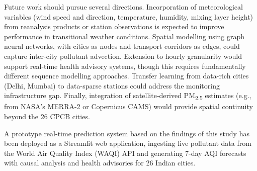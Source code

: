 \documentclass[conference]{IEEEtran}
\begin{document}
Future work should pursue several directions. Incorporation of meteorological variables (wind speed and direction, temperature, humidity, mixing layer height) from reanalysis products or station observations is expected to improve performance in transitional weather conditions. Spatial modelling using graph neural networks, with cities as nodes and transport corridors as edges, could capture inter-city pollutant advection. Extension to hourly granularity would support real-time health advisory systems, though this requires fundamentally different sequence modelling approaches. Transfer learning from data-rich cities (Delhi, Mumbai) to data-sparse stations could address the monitoring infrastructure gap. Finally, integration of satellite-derived PM\textsubscript{2.5} estimates (e.g., from NASA's MERRA-2 or Copernicus CAMS) would provide spatial continuity beyond the 26 CPCB cities.

A prototype real-time prediction system based on the findings of this study has been deployed as a Streamlit web application, ingesting live pollutant data from the World Air Quality Index (WAQI) API and generating 7-day AQI forecasts with causal analysis and health advisories for 26 Indian cities.
\end{document}
